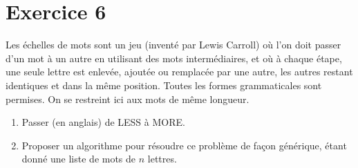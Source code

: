 \documentclass[a4paper,10pt]{article}
\begin{document}
\section*{Exercice 6}

Les échelles de mots sont un jeu (inventé par Lewis Carroll) où l’on doit
passer d’un mot à un autre en utilisant des mots intermédiaires, et où à chaque étape, une
seule lettre est enlevée, ajoutée ou remplacée par une autre, les autres restant identiques
et dans la même position. Toutes les formes grammaticales sont permises. On se restreint
ici aux mots de même longueur.

\begin{enumerate}
\item Passer (en anglais) de LESS à MORE.
\item Proposer un algorithme pour résoudre ce problème de façon générique, étant donné
une liste de mots de $n$ lettres.
\end{enumerate}
\end{document}
